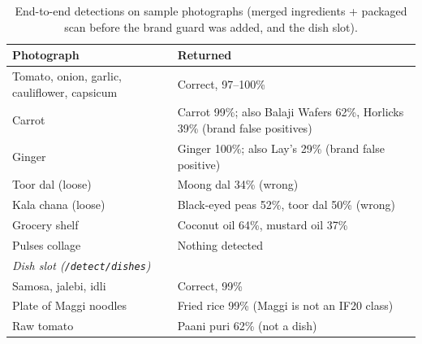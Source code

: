 \documentclass[journal]{IEEEtran}
\begin{document}
\begin{table}[!tb]
\caption{End-to-end detections on sample photographs (merged
ingredients + packaged scan before the brand guard was added, and the
dish slot).}
\label{tab:e2e}
\centering
\scriptsize
\setlength{\tabcolsep}{3pt}
\begin{tabularx}{\columnwidth}{l X}
\toprule
\textbf{Photograph} & \textbf{Returned} \\
\midrule
Tomato, onion, garlic, cauliflower, capsicum & Correct, 97--100\% \\
Carrot & Carrot 99\%; also Balaji Wafers 62\%, Horlicks 39\% (brand false positives) \\
Ginger & Ginger 100\%; also Lay's 29\% (brand false positive) \\
Toor dal (loose) & Moong dal 34\% (wrong) \\
Kala chana (loose) & Black-eyed peas 52\%, toor dal 50\% (wrong) \\
Grocery shelf & Coconut oil 64\%, mustard oil 37\% \\
Pulses collage & Nothing detected \\
\midrule
\multicolumn{2}{l}{\textit{Dish slot (\texttt{/detect/dishes})}} \\
Samosa, jalebi, idli & Correct, 99\% \\
Plate of Maggi noodles & Fried rice 99\% (Maggi is not an IF20 class) \\
Raw tomato & Paani puri 62\% (not a dish) \\
\bottomrule
\end{tabularx}
\end{table}
\end{document}

